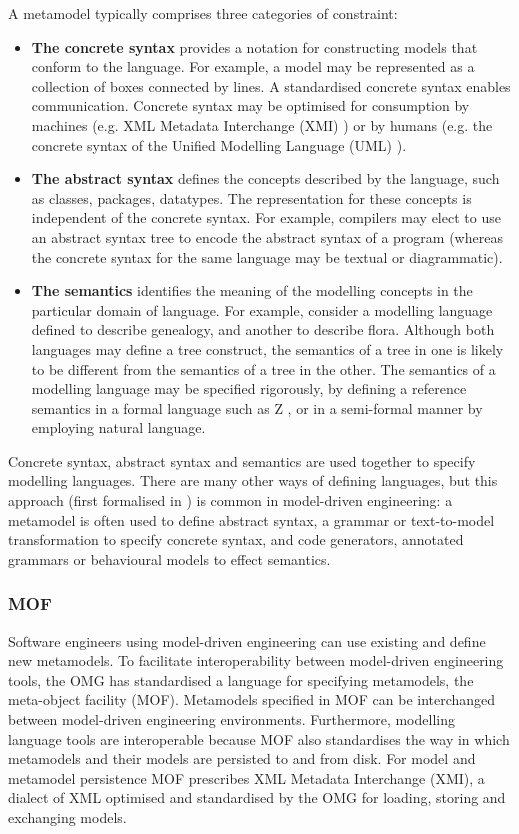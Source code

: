 A metamodel typically comprises three categories of constraint:

\begin{itemize}
	\item \textbf{The concrete syntax} provides a notation for constructing models that conform to the language. For example, a model may be represented as a collection of boxes connected by lines. A standardised concrete syntax enables communication. Concrete syntax may be optimised for consumption by machines (e.g. XML Metadata Interchange (XMI) \cite{xmi}) or by humans (e.g. the concrete syntax of the Unified Modelling Language (UML) \cite{uml212}).
	\item \textbf{The abstract syntax} defines the concepts described by the language, such as classes, packages, datatypes. The representation for these concepts is independent of the concrete syntax. For example, compilers may elect to use an abstract syntax tree to encode the abstract syntax of a program (whereas the concrete syntax for the same language may be textual or diagrammatic).
	\item \textbf{The semantics} identifies the meaning of the modelling concepts in the particular domain of language. For example, consider a modelling language defined to describe genealogy, and another to describe flora. Although both languages may define a tree construct, the semantics of a tree in one is likely to be different from the semantics of a tree in the other. The semantics of a modelling language may be specified rigorously, by defining a reference semantics in a formal language such as Z \cite{z}, or in a semi-formal manner by employing natural language.
\end{itemize}

Concrete syntax, abstract syntax and semantics are used together to specify modelling languages. There are many other ways of defining languages, but this approach (first formalised in \cite{alvarez01mml}) is common in model-driven engineering: a metamodel is often used to define abstract syntax, a grammar or text-to-model transformation to specify concrete syntax, and code generators, annotated grammars or behavioural models to effect semantics.

\subsubsection{MOF}
Software engineers using model-driven engineering can use existing and define new metamodels. To facilitate interoperability between model-driven engineering tools, the OMG has standardised a language for specifying metamodels, the meta-object facility (MOF). Metamodels specified in MOF can be interchanged between model-driven engineering environments. Furthermore, modelling language tools are interoperable because MOF also standardises the way in which metamodels and their models are persisted to and from disk. For model and metamodel persistence MOF prescribes XML Metadata Interchange (XMI), a dialect of XML optimised and standardised by the OMG for loading, storing and exchanging models.

